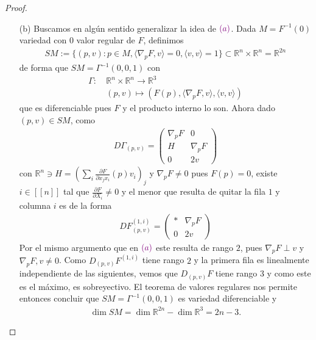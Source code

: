 \documentclass[11pt]{article}
\newcommand{\R}{\mathbb{R}}
\newcommand{\dpart}[2]{\frac{\partial#1}{\partial#2}}
\newcommand{\nat}[1]{[\![#1]\!]}
\newcommand{\ip}[2]{\langle #1 , #2 \rangle}
\newcommand{\paint}[2]{\color{#1}{#2}}
\begin{document}
\begin{proof}
\begin{itemize}
\item[(b)] Buscamos en alg\'un sentido generalizar la idea de $\paint{purple}{(a)}$. Dada $M = F^{-1}(0)$ variedad con $0$ valor regular de $F$, definimos
\begin{align*}
SM := \{(p,v) : p \in M, \ip{\nabla_pF}{v} = 0, \ip{v}{v} = 1\} \subset \R^n \times \R^n = \R^{2n}
\end{align*}
de forma que $SM = \Gamma^{-1}(0,0,1)$ con
\begin{align*}
\Gamma : \ &\R^n \times \R^n \to \R^3 \\
&(p,v) \longmapsto (F(p),\ip{\nabla_pF}{v},\ip{v}{v})
\end{align*}
que es diferenciable pues $F$ y el producto interno lo son. Ahora dado $(p,v) \in SM$, como
\begin{align*}
D\Gamma_{(p,v)} = \begin{pmatrix}
\nabla_pF & 0\\
H & \nabla_pF\\
0 & 2v
\end{pmatrix}
\end{align*}
con $\R^n \ni H = \left(\sum_i\dpart{F}{x_jx_i}(p)v_i\right)_j$ y $\nabla_pF \neq 0$ pues $F(p) = 0$, existe $i \in \nat{n}$ tal que $\dpart{F}{X_i} \neq 0$ y el menor que resulta de quitar la fila $1$ y columna $i$ es de la forma
\begin{align*}
DF_{(p,v)}^{(1,i)} = \begin{pmatrix}
* & \nabla_pF \\
0 & 2v
\end{pmatrix}
\end{align*}
Por el mismo argumento que en $\paint{purple}{(a)}$ este resulta de rango $2$, pues $\nabla_pF \perp v$ y $\nabla_pF,v \neq 0$. Como $D_{(p,v)}F^{(1,i)}$ tiene rango $2$ y la primera fila es linealmente independiente de las siguientes, vemos que $D_{(p,v)}F$ tiene rango $3$ y como este es el m\'aximo, es sobreyectivo. El teorema de valores regulares nos permite entonces concluir que $SM = \Gamma^{-1}(0,0,1)$ es variedad diferenciable y
\begin{align*}
\dim SM = \dim \R^{2n} - \dim \R^3 = 2n-3.
\end{align*}
\end{itemize}
\end{proof}
\end{document}
